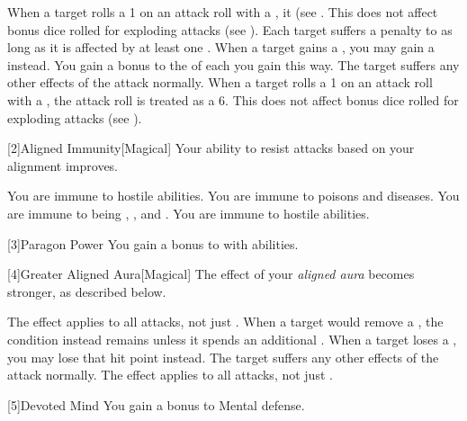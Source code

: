          When a target rolls a 1 on an attack roll with a , it  (see .
        This does not affect bonus dice rolled for exploding attacks (see ).
         Each target suffers a  penalty to  as long as it is affected by at least one .
         When a target gains a , you may gain a  instead.
        You gain a  bonus to the  of each  you gain this way.
        The target suffers any other effects of the attack normally.
         When a target rolls a 1 on an attack roll with a , the attack roll is treated as a 6.
        This does not affect bonus dice rolled for exploding attacks (see ).

        [2]{Aligned Immunity}[Magical]
        Your ability to resist attacks based on your alignment improves.

         You are immune to hostile  abilities.
         You are immune to poisons and diseases.
         You are immune to being , , and .
         You are immune to hostile  abilities.

        [3]{Paragon Power}
        You gain a  bonus to  with  abilities.

        [4]{Greater Aligned Aura}[Magical]
        The effect of your \textit{aligned aura} becomes stronger, as described below.

         The effect applies to all attacks, not just .
         When a target would remove a , the condition instead remains unless it spends an additional .
         When a target loses a , you may lose that hit point instead.
        The target suffers any other effects of the attack normally.
         The effect applies to all attacks, not just .

        [5]{Devoted Mind} You gain a  bonus to Mental defense.

